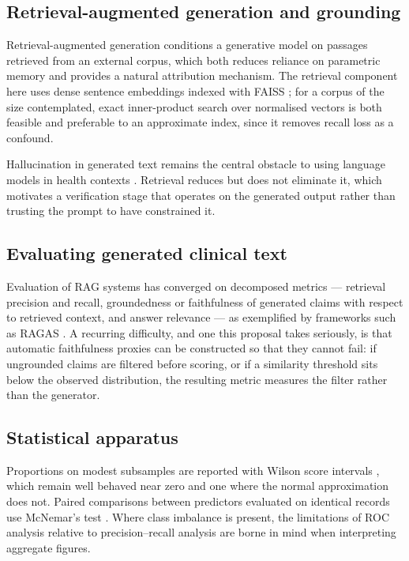 \documentclass[11pt,a4paper]{article}
\begin{document}
\subsection{Retrieval-augmented generation and grounding}

Retrieval-augmented generation \cite{lewis2020rag} conditions a generative model on
passages retrieved from an external corpus, which both reduces reliance on
parametric memory and provides a natural attribution mechanism. The retrieval
component here uses dense sentence embeddings \cite{reimers2019sbert} indexed with
FAISS \cite{johnson2019faiss}; for a corpus of the size contemplated, exact
inner-product search over normalised vectors is both feasible and preferable to an
approximate index, since it removes recall loss as a confound.

Hallucination in generated text remains the central obstacle to using language
models in health contexts \cite{ji2023hallucination}. Retrieval reduces but does
not eliminate it, which motivates a verification stage that operates on the
generated output rather than trusting the prompt to have constrained it.

\subsection{Evaluating generated clinical text}

Evaluation of RAG systems has converged on decomposed metrics --- retrieval
precision and recall, groundedness or faithfulness of generated claims with respect
to retrieved context, and answer relevance --- as exemplified by frameworks such as
RAGAS \cite{es2024ragas}. A recurring difficulty, and one this proposal takes
seriously, is that automatic faithfulness proxies can be constructed so that they
cannot fail: if ungrounded claims are filtered before scoring, or if a similarity
threshold sits below the observed distribution, the resulting metric measures the
filter rather than the generator.

\subsection{Statistical apparatus}

Proportions on modest subsamples are reported with Wilson score intervals
\cite{wilson1927probable}, which remain well behaved near zero and one where the
normal approximation does not. Paired comparisons between predictors evaluated on
identical records use McNemar's test \cite{mcnemar1947note}. Where class
imbalance is present, the limitations of ROC analysis relative to
precision--recall analysis \cite{saito2015precision} are borne in mind when
interpreting aggregate figures.
\end{document}
